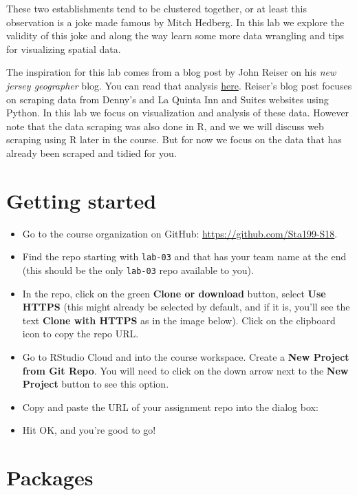 \documentclass[]{book}
\theoremstyle{definition}
\theoremstyle{definition}
\theoremstyle{definition}
\theoremstyle{remark}
\begin{document}
These two establishments tend to be clustered together, or at least this
observation is a joke made famous by Mitch Hedberg. In this lab we
explore the validity of this joke and along the way learn some more data
wrangling and tips for visualizing spatial data.

The inspiration for this lab comes from a blog post by John Reiser on
his \emph{new jersey geographer} blog. You can read that analysis
\href{http://njgeo.org/2014/01/30/mitch-hedberg-and-gis/}{here}.
Reiser's blog post focuses on scraping data from Denny's and La Quinta
Inn and Suites websites using Python. In this lab we focus on
visualization and analysis of these data. However note that the data
scraping was also done in R, and we we will discuss web scraping using R
later in the course. But for now we focus on the data that has already
been scraped and tidied for you.

\chapter{Getting started}\label{getting-started}

\begin{itemize}
\item
  Go to the course organization on GitHub:
  \url{https://github.com/Sta199-S18}.
\item
  Find the repo starting with \texttt{lab-03} and that has your team
  name at the end (this should be the only \texttt{lab-03} repo
  available to you).
\item
  In the repo, click on the green \textbf{Clone or download} button,
  select \textbf{Use HTTPS} (this might already be selected by default,
  and if it is, you'll see the text \textbf{Clone with HTTPS} as in the
  image below). Click on the clipboard icon to copy the repo URL.
\item
  Go to RStudio Cloud and into the course workspace. Create a
  \textbf{New Project from Git Repo}. You will need to click on the down
  arrow next to the \textbf{New Project} button to see this option.
\item
  Copy and paste the URL of your assignment repo into the dialog box:
\item
  Hit OK, and you're good to go!
\end{itemize}

\chapter{Packages}\label{packages}
\end{document}
